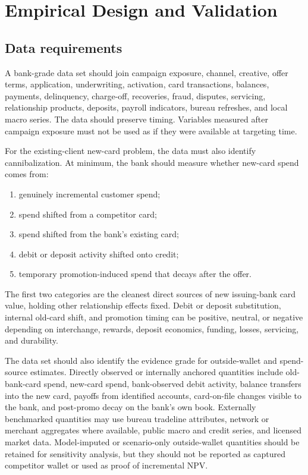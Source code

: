 \documentclass[11pt]{article}
\newcommand{\1}{\mathbf{1}}
\begin{document}
\section{Empirical Design and Validation}
\label{sec:validation}

\subsection{Data requirements}

A bank-grade data set should join campaign exposure, channel, creative, offer
terms, application, underwriting, activation, card transactions, balances,
payments, delinquency, charge-off, recoveries, fraud, disputes, servicing,
relationship products, deposits, payroll indicators, bureau refreshes, and
local macro series. The data should preserve timing. Variables measured after
campaign exposure must not be used as if they were available at targeting time.

For the existing-client new-card problem, the data must also identify
cannibalization. At minimum, the bank should measure whether new-card spend
comes from:
\begin{enumerate}[label=\alph*.]
  \item genuinely incremental customer spend;
  \item spend shifted from a competitor card;
  \item spend shifted from the bank's existing card;
  \item debit or deposit activity shifted onto credit;
  \item temporary promotion-induced spend that decays after the offer.
\end{enumerate}
The first two categories are the cleanest direct sources of new issuing-bank
card value, holding other relationship effects fixed. Debit or deposit
substitution, internal old-card shift, and promotion timing can be positive,
neutral, or negative depending on interchange, rewards, deposit economics,
funding, losses, servicing, and durability.

The data set should also identify the evidence grade for outside-wallet and
spend-source estimates. Directly observed or internally anchored quantities
include old-bank-card spend, new-card spend, bank-observed debit activity,
balance transfers into the new card, payoffs from identified accounts,
card-on-file changes visible to the bank, and post-promo decay on the bank's
own book. Externally benchmarked quantities may use bureau tradeline
attributes, network or merchant aggregates where available, public macro and
credit series, and licensed market data. Model-imputed or scenario-only
outside-wallet quantities should be retained for sensitivity analysis, but they
should not be reported as captured competitor wallet or used as proof of
incremental NPV.
\end{document}
